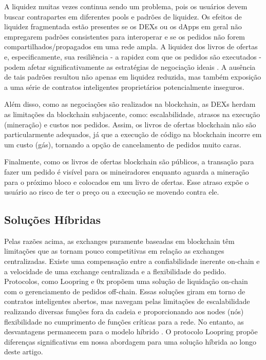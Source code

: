 \documentclass[UTF8,nofonts]{article}
\begin{document}
\begin{multicols}{2}
A liquidez muitas vezes continua sendo um problema, pois os usuários devem buscar contrapartes em diferentes pools e padrões de liquidez. Os efeitos de liquidez fragmentada estão presentes se os DEXs ou os dApps em geral não empregarem padrões consistentes para interoperar e se os pedidos não forem compartilhados/propagados em uma rede ampla. A liquidez dos livros de ofertas e, especificamente, sua resiliência - a rapidez com que os pedidos são executados - podem afetar significativamente as estratégias de negociação ideais \cite{limitorderliquidity}. A ausência de tais padrões resultou não apenas em liquidez reduzida, mas também exposição a uma série de contratos inteligentes proprietários potencialmente inseguros.

Além disso, como as negociações são realizados na blockchain, as DEXs herdam as limitações da blockchain subjacente, como: escalabilidade, atrasos na execução (mineração) e custos nos pedidos. Assim, os livros de ofertas blockchain não são particularmente adequados, já que a execução de código na blockchain incorre em um custo (gás), tornando a opção de cancelamento de pedidos muito caras. 

Finalmente, como os livros de ofertas blockchain são públicos, a transação para fazer um pedido é visível para os mineiradores enquanto aguarda a mineração para o próximo bloco e colocados em um livro de ofertas. Esse atraso expõe o usuário ao risco de ter o preço ou a execução se movendo contra ele.

\subsection{Soluções Híbridas}
Pelas razões acima, as exchanges puramente baseadas em blockchain têm limitações que as tornam pouco competitivas em relação as exchanges centralizadas. Existe uma compensação entre a confiabilidade inerente on-chain e a velocidade de uma exchange centralizada e a flexibilidade do pedido. Protocolos, como Loopring e 0x \cite{warren20170x} propõem uma solução de liquidação on-chain com o gerenciamento de pedidos off-chain. Essas soluções giram em torno de contratos inteligentes abertos, mas navegam pelas limitações de escalabilidade realizando diversas funções fora da cadeia e proporcionando aos nodes (nós) flexibilidade no cumprimento de funções críticas para a rede. No entanto, as desvantagens permanecem para o modelo híbrido \cite{costofdecent}. O protocolo Loopring propõe diferenças significativas em nossa abordagem para uma solução híbrida ao longo deste artigo.



\end{multicols}
\end{document}
